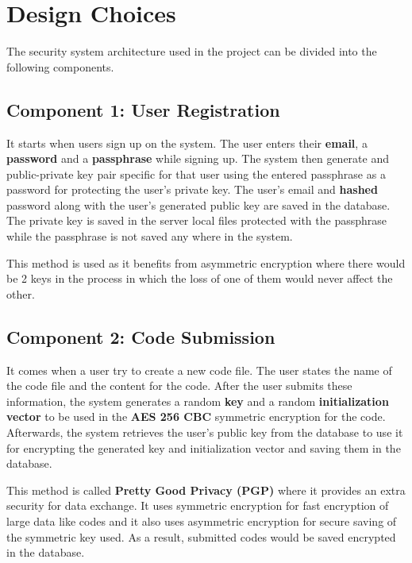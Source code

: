 \chapter{Design Choices}

The security system architecture used in the project can be divided into the following components.

\section{Component 1: User Registration}

It starts when users sign up on the system. The user enters their \textbf{email}, a \textbf{password} and a \textbf{passphrase} while signing up. The system then generate and public-private key pair specific for that user using the entered passphrase as a password for protecting the user's private key. The user's email and \textbf{hashed} password along with the user's generated public key are saved in the database. The private key is saved in the server local files protected with the passphrase while the passphrase is not saved any where in the system.

This method is used as it benefits from asymmetric encryption where there would be 2 keys in the process in which the loss of one of them would never affect the other.

\section{Component 2: Code Submission}
\label{sec:pgp_info_1}

It comes when a user try to create a new code file. The user states the name of the code file and the content for the code. After the user submits these information, the system generates a random \textbf{key} and a random \textbf{initialization vector} to be used in the \textbf{AES 256 CBC} symmetric encryption for the code. Afterwards, the system retrieves the user's public key from the database to use it for encrypting the generated key and initialization vector and saving them in the database.

This method is called \textbf{Pretty Good Privacy (PGP)} where it provides an extra security for data exchange. It uses symmetric encryption for fast encryption of large data like codes and it also uses asymmetric encryption for secure saving of the symmetric key used. As a result, submitted codes would be saved encrypted in the database.


